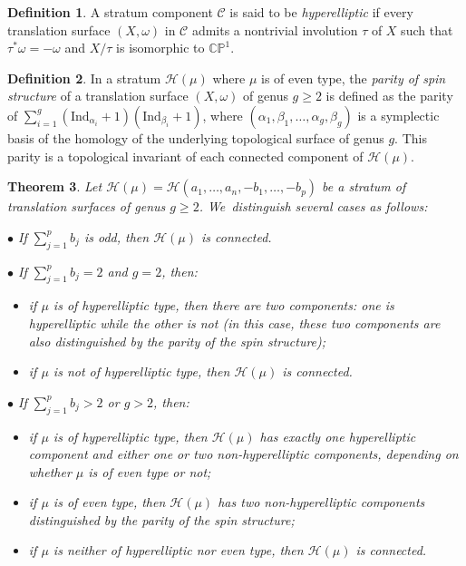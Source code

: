 \documentclass[JEP,XML,SOM,Unicode,NoFloatCountersInSection,published]{cedram}
\newcommand{\sbullet}{{\scriptscriptstyle\bullet}}
\newtheorem{thm}{Theorem}[section]
\theoremstyle{definition}
\newtheorem{defn}[thm]{Definition}
\begin{document}
\begin{defn}
A stratum component $\mathcal{C}$ is said to be \textit{hyperelliptic} if every translation surface $(X,\omega)$ in $\mathcal{C}$ admits a nontrivial involution $\tau$ of $X$ such that $\tau^{\ast} \omega = -\omega$ and $X / \tau$ is isomorphic to $\mathbb{CP}^{1}$.
\end{defn}

\begin{defn}
In a stratum $\mathcal{H}(\mu)$ where $\mu$ is of even type, the \textit{parity of spin structure} of a translation surface $(X,\omega)$ of genus $g \geq 2$ is defined as the parity of $\sum_{i=1}^{g} (\mathrm{Ind}_{\alpha_{i}}+1)(\mathrm{Ind}_{\beta_{i}}+1)$, where $(\alpha_{1},\beta_{1},\dots,\alpha_{g},\beta_{g})$ is a symplectic basis of the homology of the underlying topological surface of genus $g$. This parity is a topological invariant of each connected component of $\mathcal{H}(\mu)$.
\end{defn}

\begin{thm}\label{thm:BoissyHigherGenus}
Let $\mathcal{H}(\mu)=\mathcal{H}(a_{1},\dots,a_{n},-b_{1},\dots,-b_{p})$ be a stratum of translation surfaces of genus $g \geq 2$. We~distinguish several cases as follows:

$\sbullet$ If $\sum_{j=1}^p b_{j}$ is odd, then $\mathcal{H}(\mu)$ is connected.

$\sbullet$ If $\sum_{j=1}^p b_{j} =2$ and $g=2$, then:
\begin{itemize}
\item if $\mu$ is of hyperelliptic type, then
there are two components: one is hyperelliptic while the other is not (in this case, these two components are also distinguished by the parity of the spin structure);
\item if $\mu$ is not of hyperelliptic type, then $\mathcal{H}(\mu)$ is connected.
\end{itemize}

$\sbullet$ If $\sum_{j=1}^p b_{j} >2$ or $g>2$, then:
\begin{itemize}
\item if $\mu$ is of hyperelliptic type, then $\mathcal{H}(\mu)$ has exactly one hyperelliptic component and either one or two non-hyperelliptic components, depending on whether $\mu$ is of even type or not;
\item if $\mu$ is of even type, then $\mathcal{H}(\mu)$ has two non-hyperelliptic components distinguished by the parity of the spin structure;
\item if $\mu$ is neither of hyperelliptic nor even type, then $\mathcal{H}(\mu)$ is connected.
\end{itemize}
\end{thm}
\end{document}

